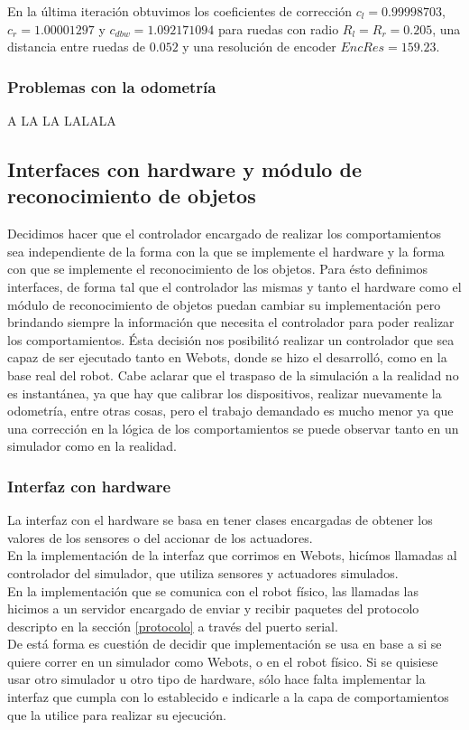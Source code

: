En la \'ultima iteraci\'on obtuvimos los coeficientes de correcci\'on $c_l = 0.99998703$, $c_r = 1.00001297$
y $c_{dbw} = 1.092171094$ para ruedas con radio $R_l = R_r = 0.205$, una distancia entre ruedas de $0.052$ y
una resoluci\'on de encoder $EncRes = 159.23$.

\subsubsection{Problemas con la odometr\'ia}
\label{odometry:problems}
A LA LA LALALA

\newpage
\subsection{Interfaces con hardware y m\'odulo de reconocimiento de objetos}
\label{interfaces}
Decidimos hacer que el controlador encargado de realizar los comportamientos sea independiente
de la forma con la que se implemente el hardware y la forma con que se implemente el reconocimiento
de los objetos. Para \'esto definimos interfaces, de forma tal que el controlador las mismas
y tanto el hardware como el m\'odulo de reconocimiento de objetos puedan cambiar su implementaci\'on
pero brindando siempre la informaci\'on que necesita el controlador para poder realizar
los comportamientos. \'Esta decisi\'on nos posibilit\'o realizar un controlador que sea capaz de ser
ejecutado tanto en Webots, donde se hizo el desarroll\'o, como en la base real del robot. Cabe aclarar
que el traspaso de la simulaci\'on a la realidad no es instant\'anea, ya que hay que calibrar los dispositivos,
realizar nuevamente la odometr\'ia, entre otras cosas, pero el trabajo demandado es mucho menor ya
que una correcci\'on en la l\'ogica de los comportamientos se puede observar tanto en un simulador como
en la realidad.

\subsubsection{Interfaz con hardware}
La interfaz con el hardware se basa en tener clases encargadas de obtener los valores de los sensores
o del accionar de los actuadores.
\\En la implementaci\'on de la interfaz que corrimos en Webots, hic\'imos
llamadas al controlador del simulador, que utiliza sensores y actuadores simulados.
\\En la implementaci\'on que se comunica con el robot f\'isico,
las llamadas las hicimos a un servidor encargado de enviar y recibir paquetes del protocolo descripto
en la secci\'on \ref{protocolo} a trav\'es del puerto serial.
\\De est\'a forma es cuesti\'on de decidir que implementaci\'on se usa en base a si se quiere
correr en un simulador como Webots, o en el robot f\'isico. Si se quisiese usar otro simulador
u otro tipo de hardware, s\'olo hace falta implementar la interfaz que cumpla con lo establecido e
indicarle a la capa de comportamientos que la utilice para realizar su ejecuci\'on.

